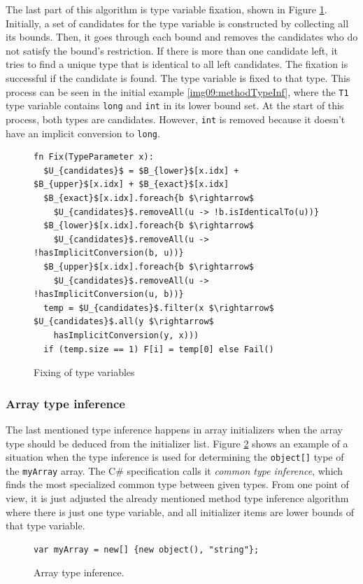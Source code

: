 The last part of this algorithm is type variable fixation, shown in Figure \ref{img13:methodTypeInference4}. 
Initially, a set of candidates for the type variable is constructed by collecting all its bounds.
Then, it goes through each bound and removes the candidates who do not satisfy the bound’s restriction. 
If there is more than one candidate left, it tries to find a unique type that is identical to all left candidates. 
The fixation is successful if the candidate is found. 
The type variable is fixed to that type. 
This process can be seen in the initial example \ref{img09:methodTypeInf}, where the \texttt{T1} type variable contains \texttt{long} and \texttt{int} in its lower bound set. 
At the start of this process, both types are candidates. 
However, \texttt{int} is removed because it doesn’t have an implicit conversion to \texttt{long}.
\par
\begin{figure}[h!]
\begin{lstlisting}[style=myAlgo, mathescape=true]
fn Fix(TypeParameter x):
  $U_{candidates}$ = $B_{lower}$[x.idx] + $B_{upper}$[x.idx] + $B_{exact}$[x.idx]
  $B_{exact}$[x.idx].foreach{b $\rightarrow$ 
    $U_{candidates}$.removeAll(u -> !b.isIdenticalTo(u))}
  $B_{lower}$[x.idx].foreach{b $\rightarrow$ 
    $U_{candidates}$.removeAll(u -> !hasImplicitConversion(b, u))}
  $B_{upper}$[x.idx].foreach{b $\rightarrow$ 
    $U_{candidates}$.removeAll(u -> !hasImplicitConversion(u, b))}
  temp = $U_{candidates}$.filter(x $\rightarrow$ $U_{candidates}$.all(y $\rightarrow$ 
    hasImplicitConversion(y, x)))
  if (temp.size == 1) F[i] = temp[0] else Fail()
\end{lstlisting}
\caption{Fixing of type variables}
\label{img13:methodTypeInference4}
\end{figure}

\subsubsection*{Array type inference}
The last mentioned type inference happens in array initializers when the array type should be deduced from the initializer list. 
Figure \ref{img14:arrayTypeInf} shows an example of a situation when the type inference is used for determining the \texttt{object[]} type of the \texttt{myArray} array. 
The C\# specification calls it \textit{common type inference}, which finds the most specialized common type between given types. 
From one point of view, it is just adjusted the already mentioned method type inference algorithm where there is just one type variable, and all initializer items are lower bounds of that type variable.
\begin{figure}[h]
\begin{lstlisting}[style=csharp]
var myArray = new[] {new object(), "string"};
\end{lstlisting}
\caption{Array type inference.}
\label{img14:arrayTypeInf}
\end{figure}

